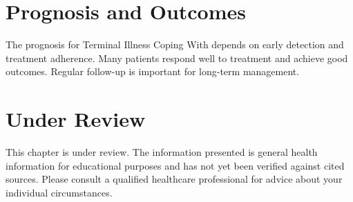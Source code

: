 \section*{Prognosis and Outcomes}
The prognosis for Terminal Illness Coping With depends on early detection and treatment adherence. Many patients respond well to treatment and achieve good outcomes. Regular follow-up is important for long-term management.
\section*{Under Review}
This chapter is under review. The information presented is general health information for educational purposes and has not yet been verified against cited sources. Please consult a qualified healthcare professional for advice about your individual circumstances.


\clearpage

